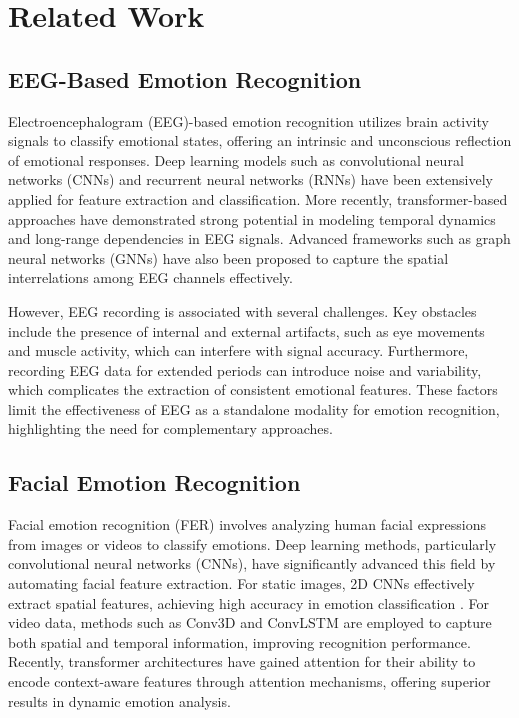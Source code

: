 \section{Related Work\label{sec:section2}
}

\subsection{EEG-Based Emotion Recognition}
Electroencephalogram (EEG)-based emotion recognition utilizes brain activity signals to classify emotional states, offering an intrinsic and unconscious reflection of emotional responses. Deep learning models such as convolutional neural networks (CNNs) \cite{schirrmeister2017deep} and recurrent neural networks (RNNs) \cite{zheng2017identifying} have been extensively applied for feature extraction and classification. More recently, transformer-based approaches \cite{wang2022eegtransformers,liang2024fetcheeg} have demonstrated strong potential in modeling temporal dynamics and long-range dependencies in EEG signals. Advanced frameworks such as graph neural networks (GNNs)\cite{Gan2020eeg} have also been proposed to capture the spatial interrelations among EEG channels effectively.

However, EEG recording is associated with several challenges. Key obstacles include the presence of internal and external artifacts, such as eye movements and muscle activity, which can interfere with signal accuracy. Furthermore, recording EEG data for extended periods can introduce noise and variability, which complicates the extraction of consistent emotional features\cite{eegReview}. These factors limit the effectiveness of EEG as a standalone modality for emotion recognition, highlighting the need for complementary approaches.

\subsection{Facial Emotion Recognition}
Facial emotion recognition (FER) involves analyzing human facial expressions from images or videos to classify emotions. Deep learning methods, particularly convolutional neural networks (CNNs), have significantly advanced this field by automating facial feature extraction. For static images, 2D CNNs effectively extract spatial features, achieving high accuracy in emotion classification \cite{breuer2017deep}. For video data, methods such as Conv3D \cite{fan2016video} and ConvLSTM \cite{huang2018end} are employed to capture both spatial and temporal information, improving recognition performance. Recently, transformer architectures \cite{zhao2021former,huang2021facial} have gained attention for their ability to encode context-aware features through attention mechanisms, offering superior results in dynamic emotion analysis.

